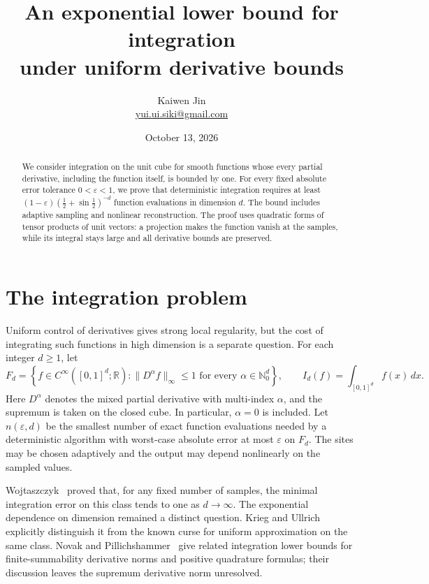 \documentclass[11pt]{article}
\title{An exponential lower bound for integration\protect\\under uniform derivative bounds}
\author{Kaiwen Jin\\\small\href{mailto:yui.ui.siki@gmail.com}{yui.ui.siki@gmail.com}}
\date{October 13, 2026}
\newcommand{\R}{\mathbb R}
\newcommand{\N}{\mathbb N}
\begin{document}
\maketitle
\begin{abstract}
We consider integration on the unit cube for smooth functions whose every
partial derivative, including the function itself, is bounded by one.
For every fixed absolute error tolerance $0<\varepsilon<1$, we prove that
deterministic integration requires at least
$(1-\varepsilon)(\tfrac12+\sin\tfrac12)^{-d}$ function evaluations in
dimension $d$. The bound includes adaptive sampling and nonlinear
reconstruction. The proof uses quadratic forms of tensor products of unit
vectors: a projection makes the function vanish at the samples, while its
integral stays large and all derivative bounds are preserved.
\end{abstract}

\section{The integration problem}

Uniform control of derivatives gives strong local regularity, but the cost
of integrating such functions in high dimension is a separate question.
For each integer $d\ge1$, let
\begin{equation}\label{eq:class}
 F_d=\left\{f\in C^\infty([0,1]^d;\R):
       \|D^\alpha f\|_\infty\le1\text{ for every }\alpha\in\N_0^d\right\},
 \qquad I_d(f)=\int_{[0,1]^d}f(x)\,dx.
\end{equation}
Here $D^\alpha$ denotes the mixed partial derivative with multi-index
$\alpha$, and the supremum is taken on the closed cube. In particular,
$\alpha=0$ is included. Let $n(\varepsilon,d)$ be the smallest number of
exact function evaluations needed by a deterministic algorithm with
worst-case absolute error at most $\varepsilon$ on $F_d$. The sites may be
chosen adaptively and the output may depend nonlinearly on the sampled values.

Wojtaszczyk~\cite[Theorem 2.1]{Wojtaszczyk} proved that, for any fixed number
of samples, the minimal integration error on this class tends to one as
$d\to\infty$. The exponential dependence on dimension remained a distinct
question. Krieg and Ullrich~\cite[Section 8.1, equation (8.5) and the
discussion after Proposition 8.3]{KriegUllrich} explicitly distinguish it
from the known curse for uniform approximation on the same class.
Novak and Pillichshammer~\cite[Section 5.2]{NovakPillichshammer} give related
integration lower bounds for finite-summability derivative norms and
positive quadrature formulas; their discussion leaves the supremum
derivative norm unresolved.
\end{document}
